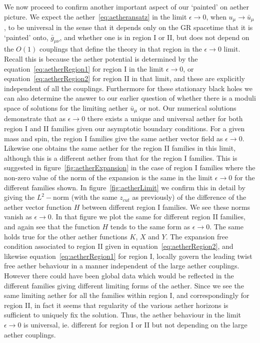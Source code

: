 \documentclass[12pt]{article}
\numberwithin{equation}{section}
\begin{document}
We now proceed to confirm another important aspect of our `painted' on aether picture. We expect the aether~\eqref{eq:aetheransatz} in the limit $\epsilon \to 0$, when $u_\mu \to \bar{u}_\mu$, to be universal in the sense that it depends only on the GR spacetime that it is `painted' onto, $\bar{g}_{\mu\nu}$, and whether one is in region I or II, but does not depend on the $O(1)$ couplings that define the theory in that region in the $\epsilon \to 0$ limit. Recall this is because the aether potential is determined by the equation~\eqref{eq:aetherRegion1} for region I in the limit $\epsilon \to 0$, or equation~\eqref{eq:aetherRegion2} for region II in that limit, and these are explicitly independent of all the couplings. 
Furthermore for these stationary black holes we can also determine the answer to our earlier question of whether there is a moduli space of solutions for the limiting aether $\bar{u}_\mu$ or not.
Our numerical solutions demonstrate that as $\epsilon \to 0$ there exists a unique and universal aether for both region I and II families given our asymptotic boundary conditions.
For a given mass and spin, the region I families give the same aether vector field as $\epsilon \to 0$. Likewise one obtains the same aether for the region II families in this limit, although this is a different aether from that for the region I families.
This is suggested in figure~\ref{fig:aetherExpansion} in the case of region I families where the non-zero value of the norm of the expansion is the same in the limit $\epsilon \to 0$ for the different families shown. 
In figure~\ref{fig:aetherLimit} we confirm this in detail by giving the $L^2-$norm 
(with the same $z_{cut}$ as previously)
of the difference of the aether vector function $H$ between different region I families. We see these norms vanish as $\epsilon \to 0$. In that figure we plot the same for different region II families, and again see that the function $H$ tends to the same form as $\epsilon \to 0$. The same holds true for the other aether functions $K$, $X$ and $Y$. 
The expansion free condition associated to region II given in equation~\eqref{eq:aetherRegion2}, and likewise equation~\eqref{eq:aetherRegion1} for region I,  locally govern the leading twist free aether behaviour in a manner independent of the large aether couplings. However there could have been global data which would be reflected in the different families giving different limiting forms of the aether. Since we  see the same limiting aether for all the families within region I, and correspondingly for region II, in fact it seems that regularity of the various aether horizons is sufficient to uniquely fix the solution. Thus, the aether behaviour in the limit $\epsilon \to 0$ is universal, ie. different for region I or II but not depending on the large aether couplings.
\end{document}
